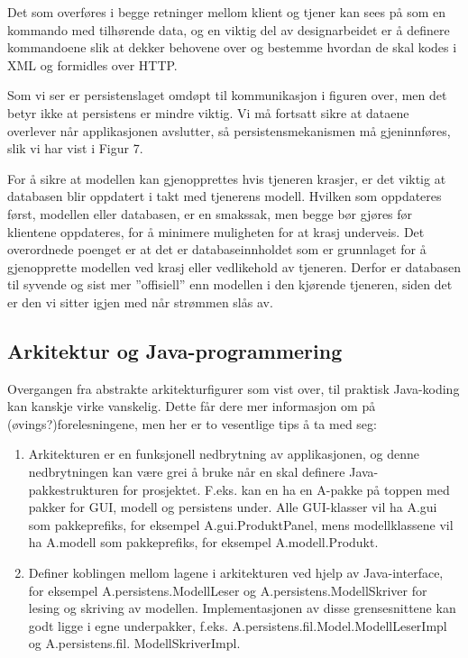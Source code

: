Det som overføres i begge retninger mellom klient og tjener kan sees på som en kommando med tilhørende data, og en viktig del av designarbeidet er å definere kommandoene slik at dekker behovene over og bestemme hvordan de skal kodes i XML og formidles over HTTP.

Som vi ser er persistenslaget omdøpt til kommunikasjon i figuren over, men det betyr ikke at persistens er mindre viktig. Vi må fortsatt sikre at dataene overlever når applikasjonen avslutter, så persistensmekanismen må gjeninnføres, slik vi har vist i Figur 7.

For å sikre at modellen kan gjenopprettes hvis tjeneren krasjer, er det viktig at databasen blir oppdatert i takt med tjenerens modell. Hvilken som oppdateres først, modellen eller databasen, er en smakssak, men begge bør gjøres før klientene oppdateres, for å minimere muligheten for at krasj underveis. Det overordnede poenget er at det er databaseinnholdet som er grunnlaget for å gjenopprette modellen ved krasj eller vedlikehold av tjeneren. Derfor er databasen til syvende og sist mer ”offisiell” enn modellen i den kjørende tjeneren, siden det er den vi sitter igjen med når strømmen slås av.

\subsection{Arkitektur og Java-programmering}

Overgangen fra abstrakte arkitekturfigurer som vist over, til praktisk Java-koding kan kanskje virke vanskelig. Dette får dere mer informasjon om på (øvings?)forelesningene, men her er to vesentlige tips å ta med seg:

\begin{enumerate}

\item
Arkitekturen er en funksjonell nedbrytning av applikasjonen, og denne nedbrytningen kan være grei å bruke når en skal definere Java-pakkestrukturen for prosjektet. F.eks. kan en ha en A-pakke på toppen med pakker for GUI, modell og persistens under. Alle GUI-klasser vil ha A.gui som pakkeprefiks, for eksempel A.gui.ProduktPanel, mens modellklassene vil ha A.modell som pakkeprefiks, for eksempel A.modell.Produkt.

\item
Definer koblingen mellom lagene i arkitekturen ved hjelp av Java-interface, for eksempel A.persistens.ModellLeser og A.persistens.ModellSkriver for lesing og skriving av modellen. Implementasjonen av disse grensesnittene kan godt ligge i egne underpakker, f.eks. A.persistens.fil.Model.ModellLeserImpl og A.persistens.fil. ModellSkriverImpl.

\end{enumerate}

